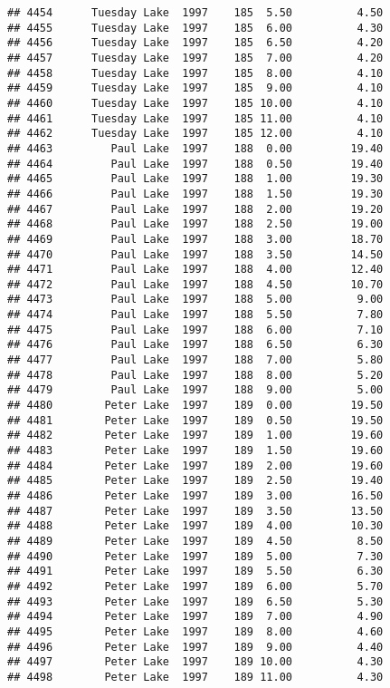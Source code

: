\documentclass[
]{article}
\begin{document}
\begin{verbatim}
## 4454      Tuesday Lake  1997    185  5.50          4.50
## 4455      Tuesday Lake  1997    185  6.00          4.30
## 4456      Tuesday Lake  1997    185  6.50          4.20
## 4457      Tuesday Lake  1997    185  7.00          4.20
## 4458      Tuesday Lake  1997    185  8.00          4.10
## 4459      Tuesday Lake  1997    185  9.00          4.10
## 4460      Tuesday Lake  1997    185 10.00          4.10
## 4461      Tuesday Lake  1997    185 11.00          4.10
## 4462      Tuesday Lake  1997    185 12.00          4.10
## 4463         Paul Lake  1997    188  0.00         19.40
## 4464         Paul Lake  1997    188  0.50         19.40
## 4465         Paul Lake  1997    188  1.00         19.30
## 4466         Paul Lake  1997    188  1.50         19.30
## 4467         Paul Lake  1997    188  2.00         19.20
## 4468         Paul Lake  1997    188  2.50         19.00
## 4469         Paul Lake  1997    188  3.00         18.70
## 4470         Paul Lake  1997    188  3.50         14.50
## 4471         Paul Lake  1997    188  4.00         12.40
## 4472         Paul Lake  1997    188  4.50         10.70
## 4473         Paul Lake  1997    188  5.00          9.00
## 4474         Paul Lake  1997    188  5.50          7.80
## 4475         Paul Lake  1997    188  6.00          7.10
## 4476         Paul Lake  1997    188  6.50          6.30
## 4477         Paul Lake  1997    188  7.00          5.80
## 4478         Paul Lake  1997    188  8.00          5.20
## 4479         Paul Lake  1997    188  9.00          5.00
## 4480        Peter Lake  1997    189  0.00         19.50
## 4481        Peter Lake  1997    189  0.50         19.50
## 4482        Peter Lake  1997    189  1.00         19.60
## 4483        Peter Lake  1997    189  1.50         19.60
## 4484        Peter Lake  1997    189  2.00         19.60
## 4485        Peter Lake  1997    189  2.50         19.40
## 4486        Peter Lake  1997    189  3.00         16.50
## 4487        Peter Lake  1997    189  3.50         13.50
## 4488        Peter Lake  1997    189  4.00         10.30
## 4489        Peter Lake  1997    189  4.50          8.50
## 4490        Peter Lake  1997    189  5.00          7.30
## 4491        Peter Lake  1997    189  5.50          6.30
## 4492        Peter Lake  1997    189  6.00          5.70
## 4493        Peter Lake  1997    189  6.50          5.30
## 4494        Peter Lake  1997    189  7.00          4.90
## 4495        Peter Lake  1997    189  8.00          4.60
## 4496        Peter Lake  1997    189  9.00          4.40
## 4497        Peter Lake  1997    189 10.00          4.30
## 4498        Peter Lake  1997    189 11.00          4.30

\end{verbatim}
\end{document}
